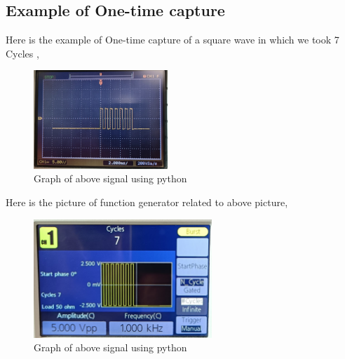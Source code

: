 \subsection{Example of One-time capture}
Here is the example of One-time capture of a square wave in which we took 7 Cycles ,\\
 \begin{figure}[h!]
    \centering
    \includegraphics[width=0.45\textwidth]{actualgraph/7cycles.jpeg}
    \caption{Graph of above signal using python}
    \label{fig:sample_image}
     \end{figure}
     \newpage
Here is the picture of function generator related to above picture, \\
\begin{figure}[h!]
    \centering
    \includegraphics[width=0.6\textwidth]{actualgraph/funcgen.jpeg}
    \caption{Graph of above signal using python}
    \label{fig:sample_image}
     \end{figure}

